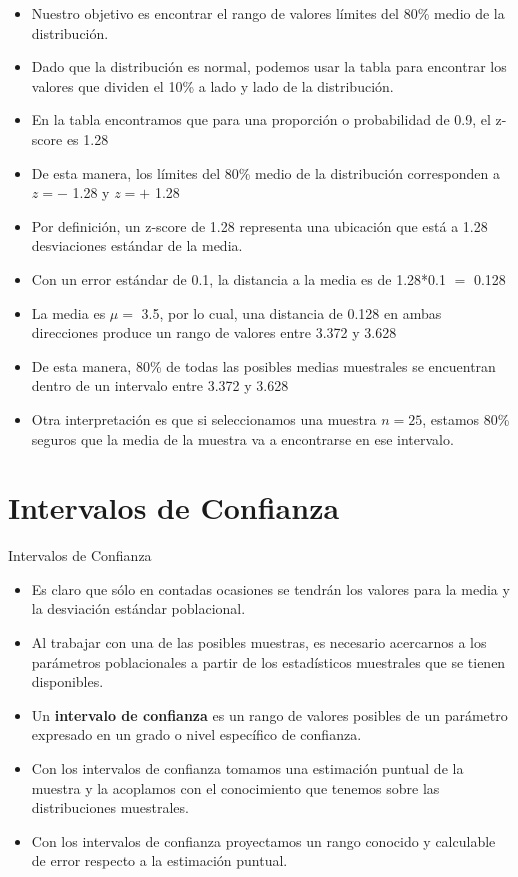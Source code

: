 \documentclass{beamer}
\begin{document}
\begin{frame}
\begin{itemize}
\justifying
\item Nuestro objetivo es encontrar el rango de valores límites del 80\% medio de la distribución.
\item Dado que la distribución es normal, podemos usar la tabla para encontrar los valores que dividen el 10\% a lado y lado de la distribución.
\item En la tabla encontramos que para una proporción o probabilidad de 0.9, el z-score es 1.28
\item De esta manera, los límites del 80\% medio de la distribución corresponden a $z=-$ 1.28 y $z=+$ 1.28
\end{itemize}
\end{frame}

\begin{frame}
\begin{itemize}
\justifying
\item Por definición, un z-score de 1.28 representa una ubicación que está a 1.28 desviaciones estándar de la media.
\item Con un error estándar de 0.1, la distancia a la media es de 1.28*0.1 $=$ 0.128
\item La media es $\mu=$ 3.5, por lo cual, una distancia de 0.128 en ambas direcciones produce un rango de valores entre 3.372 y 3.628
\item De esta manera, 80\% de todas las posibles medias muestrales se encuentran dentro de un intervalo entre 3.372 y 3.628
\item Otra interpretación es que si seleccionamos una muestra $n=25$, estamos 80\%  seguros que la media de la muestra va a encontrarse en ese intervalo.
\end{itemize}
\end{frame}

\section{Intervalos de Confianza}
\begin{frame}{Intervalos de Confianza}
\begin{itemize}
\justifying
\item Es claro que sólo en contadas ocasiones se tendrán los valores para la media y la desviación estándar poblacional.
\item Al trabajar con una de las posibles muestras, es necesario acercarnos a los parámetros poblacionales a partir de los estadísticos muestrales que se tienen disponibles.
\item Un {\bf intervalo de confianza} es un rango de valores posibles de un parámetro expresado en un grado o nivel específico de confianza.
\item Con los intervalos de confianza tomamos una estimación puntual de la muestra y la acoplamos con el conocimiento que tenemos sobre las distribuciones muestrales.
\item Con los intervalos de confianza proyectamos un rango conocido y calculable de error respecto a la estimación puntual. 
\end{itemize}
\end{frame}
\end{document}
